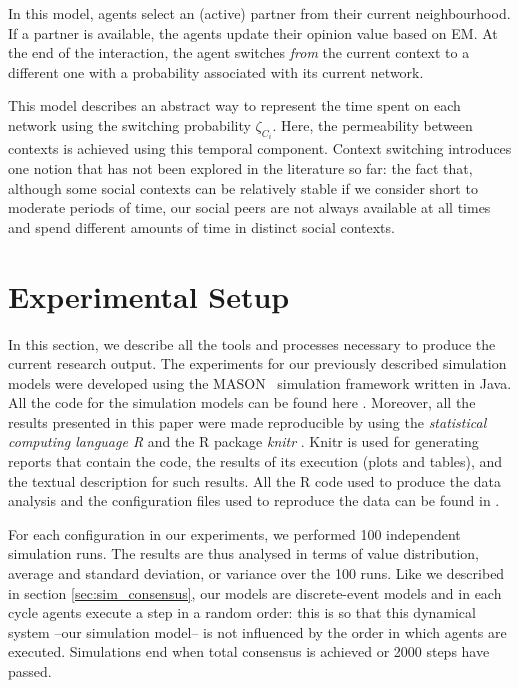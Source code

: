 \documentclass[preprint,number]{elsarticle}
\begin{document}
	\noindent In this model, agents select an (active) partner from their current neighbourhood. If a partner is available, the agents update their opinion value based on EM. At the end of the interaction, the agent switches \textit{from} the current context to a different one with a probability associated with its current network. 
	
	This model describes an abstract way to represent the time spent on each network using the switching probability $\zeta_{C_i}$. Here, the permeability between contexts is achieved using this temporal component. Context switching introduces one notion that has not been explored in the literature so far: the fact that, although some social contexts can be relatively stable if we consider short to moderate periods of time, our social peers are not always available at all times and spend different amounts of time in distinct social contexts.
	
	\section{Experimental Setup}
	\label{sec:experimental-setup}
	In this section, we describe all the tools and processes necessary to produce the current research output. The experiments for our previously described simulation models were developed using the MASON~\cite{Luke2005} simulation framework written in Java. All the code for the simulation models can be found here \cite{Nunes:Software:11067}. Moreover, all the results presented in this paper were made reproducible by using the \textit{statistical computing language R} \cite{R2008} and the R package \textit{knitr} \cite{knitr2014}. Knitr is used for generating reports that contain the code, the results of its execution (plots and tables), and the textual description for such results. All the R code used  to produce the data analysis and the configuration files used to reproduce the data can be found in \cite{NunesAntunes2014:Analysis:11898}.

For each configuration in our experiments, we performed 100 independent simulation runs. The results are thus analysed in terms of value distribution, average and standard deviation, or variance over the 100 runs. Like we described in section \ref{sec:sim_consensus}, our models are discrete-event models and in each cycle agents execute 
a step in a random order: this is so that this dynamical system --our simulation model-- is not influenced by the order in which agents are executed. Simulations end when total consensus is achieved or 2000 steps have passed.  
\end{document}
